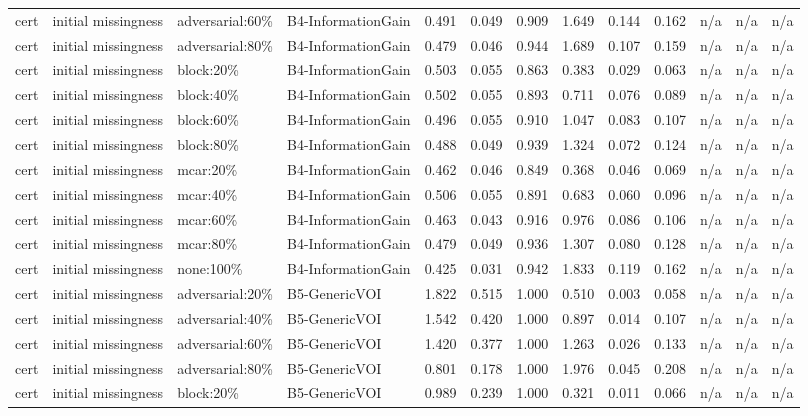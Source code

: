 \begin{table}[!ht]
{\begin{tabular}{lllllllllllll}
cert & initial missingness & adversarial:60\% & B4-InformationGain & 0.491 & 0.049 & 0.909 & 1.649 & 0.144 & 0.162 & n/a & n/a & n/a \\
cert & initial missingness & adversarial:80\% & B4-InformationGain & 0.479 & 0.046 & 0.944 & 1.689 & 0.107 & 0.159 & n/a & n/a & n/a \\
cert & initial missingness & block:20\% & B4-InformationGain & 0.503 & 0.055 & 0.863 & 0.383 & 0.029 & 0.063 & n/a & n/a & n/a \\
cert & initial missingness & block:40\% & B4-InformationGain & 0.502 & 0.055 & 0.893 & 0.711 & 0.076 & 0.089 & n/a & n/a & n/a \\
cert & initial missingness & block:60\% & B4-InformationGain & 0.496 & 0.055 & 0.910 & 1.047 & 0.083 & 0.107 & n/a & n/a & n/a \\
cert & initial missingness & block:80\% & B4-InformationGain & 0.488 & 0.049 & 0.939 & 1.324 & 0.072 & 0.124 & n/a & n/a & n/a \\
cert & initial missingness & mcar:20\% & B4-InformationGain & 0.462 & 0.046 & 0.849 & 0.368 & 0.046 & 0.069 & n/a & n/a & n/a \\
cert & initial missingness & mcar:40\% & B4-InformationGain & 0.506 & 0.055 & 0.891 & 0.683 & 0.060 & 0.096 & n/a & n/a & n/a \\
cert & initial missingness & mcar:60\% & B4-InformationGain & 0.463 & 0.043 & 0.916 & 0.976 & 0.086 & 0.106 & n/a & n/a & n/a \\
cert & initial missingness & mcar:80\% & B4-InformationGain & 0.479 & 0.049 & 0.936 & 1.307 & 0.080 & 0.128 & n/a & n/a & n/a \\
cert & initial missingness & none:100\% & B4-InformationGain & 0.425 & 0.031 & 0.942 & 1.833 & 0.119 & 0.162 & n/a & n/a & n/a \\
cert & initial missingness & adversarial:20\% & B5-GenericVOI & 1.822 & 0.515 & 1.000 & 0.510 & 0.003 & 0.058 & n/a & n/a & n/a \\
cert & initial missingness & adversarial:40\% & B5-GenericVOI & 1.542 & 0.420 & 1.000 & 0.897 & 0.014 & 0.107 & n/a & n/a & n/a \\
cert & initial missingness & adversarial:60\% & B5-GenericVOI & 1.420 & 0.377 & 1.000 & 1.263 & 0.026 & 0.133 & n/a & n/a & n/a \\
cert & initial missingness & adversarial:80\% & B5-GenericVOI & 0.801 & 0.178 & 1.000 & 1.976 & 0.045 & 0.208 & n/a & n/a & n/a \\
cert & initial missingness & block:20\% & B5-GenericVOI & 0.989 & 0.239 & 1.000 & 0.321 & 0.011 & 0.066 & n/a & n/a & n/a \\

\end{tabular}}
\end{table}

